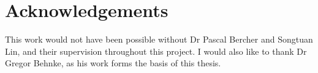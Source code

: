 \chapter*{Acknowledgements}

This work would not have been possible without Dr Pascal Bercher and Songtuan Lin, and their supervision throughout this project.
I would also like to thank Dr Gregor Behnke, as his work forms the basis of this thesis.
